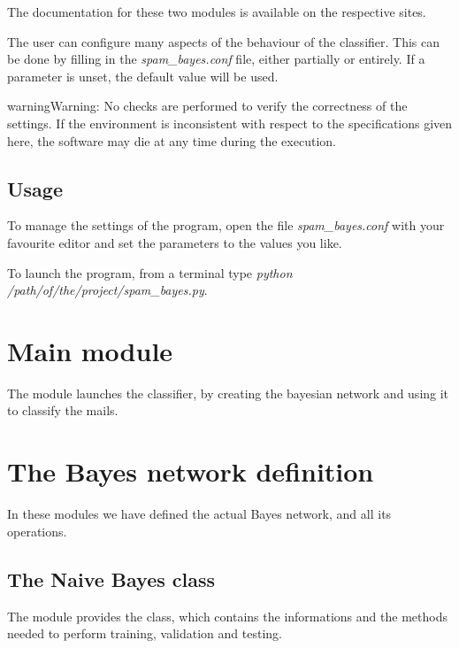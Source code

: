 \documentclass[letterpaper,10pt,english]{sphinxmanual}
\begin{document}
The documentation for these two modules is available on the respective sites.

The user can configure many aspects of the behaviour of the classifier. This can be done by filling in the \emph{spam\_bayes.conf} file, either partially or entirely. If a parameter is unset, the default value will be used.

\begin{notice}{warning}{Warning:}
No checks are performed to verify the correctness of the settings. If the environment is inconsistent with respect to the specifications given here, the software may die at any time during the execution.
\end{notice}


\section{Usage}
\label{index:usage}
To manage the settings of the program, open the file \emph{spam\_bayes.conf} with your favourite editor and set the parameters to the values you like.

To launch the program, from a terminal type
\emph{python /path/of/the/project/spam\_bayes.py}.


\chapter{Main module}
\label{index:module-spam_bayes}\label{index:main-module}
The {\hyperref[index:module-spam_bayes]{}} module launches the classifier, by creating the bayesian network and using it to classify the mails.


\chapter{The Bayes network definition}
\label{index:the-bayes-network-definition}
In these modules we have defined the actual Bayes network, and all its operations.


\section{The Naive Bayes class}
\label{index:the-naive-bayes-class}
The {\hyperref[index:module-naive_bayes]{}} module provides the {\hyperref[index:naive_bayes.Bayes]{}} class, which contains the informations and the methods needed to perform training, validation and testing.
\end{document}
